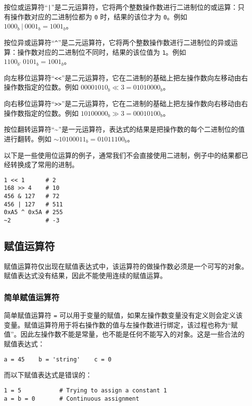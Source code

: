 按位或运算符``\texttt{|}''是二元运算符，它将两个整数操作数进行二进制位的或运算：只有操作数对应的二进制位都为 \texttt{0} 时，结果的该位才为 \texttt{0}。例如 $1000_b\ |\ 0001_b = 1001_b$。

按位异或运算符``\texttt{\textasciicircum}''是二元运算符，它将两个整数操作数进行二进制位的异或运算：操作数对应的二进制位不同时，结果的该位值为 \texttt{1}。例如 $1100_b\ \hat{}\ 0101_b = 1001_b$。

向左移位运算符``\texttt{<<}''是二元运算符，它在二进制的基础上把左操作数向左移动由右操作数指定的位数。例如 $00001010_b \ll 3 = 01010000_b$。

向右移位运算符``\texttt{>>}''是二元运算符，它在二进制的基础上把左操作数向右移动由右操作数指定的位数。例如 $10100000_b \gg 3 = 00010100_b$。

按位翻转运算符``\textasciitilde''是一元运算符，表达式的结果是把操作数的每个二进制位的值进行翻转。例如 $\mathtt{\sim}10100011_b = 01011100_b$。

以下是一些使用位运算的例子，通常我们不会直接使用二进制，例子中的结果都已经转换成了常用的进制。
\begin{lstlisting}[language=berry, numbers=none]
1 << 1      # 2
168 >> 4    # 10
456 & 127   # 72
456 | 127   # 511
0xA5 ^ 0x5A # 255
~2          # -3
\end{lstlisting}

\subsection{赋值运算符} \label{section::assign_operator}

赋值运算符仅出现在赋值表达式中，该运算符的做操作数必须是一个可写的对象。赋值表达式没有结果，因此不能使用连续的赋值运算。

\subsubsection{简单赋值运算符}

简单赋值运算符 \texttt{=} 可以用于变量的赋值，如果左操作数变量没有定义则会定义该变量。赋值运算符用于将右操作数的值与左操作数进行绑定，该过程也称为``赋值''。因此左操作数不能是常量，也不能是任何不能写入的对象。这是一些合法的赋值表达式：
\begin{lstlisting}[language=berry, numbers=none]
a = 45    b = 'string'    c = 0
\end{lstlisting}
而以下赋值表达式是错误的：
\begin{lstlisting}[language=berry, numbers=none]
1 = 5           # Trying to assign a constant 1
a = b = 0       # Continuous assignment
\end{lstlisting}

